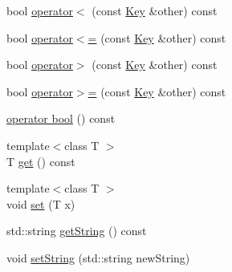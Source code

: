 \begin{DoxyCompactItemize}
bool \hyperlink{classkdb_1_1Key_aace409efd393ae21f08d333f45da2769}{operator$<$} (const \hyperlink{classkdb_1_1Key}{Key} \&other) const 
\begin{DoxyCompactList}\small\item\em \end{DoxyCompactList}\item 
bool \hyperlink{classkdb_1_1Key_a3b466f59870b989aa9ec41558bba4d19}{operator$<$=} (const \hyperlink{classkdb_1_1Key}{Key} \&other) const 
\begin{DoxyCompactList}\small\item\em \end{DoxyCompactList}\item 
bool \hyperlink{classkdb_1_1Key_a1bd2b165eeade6a71401b9b122864bad}{operator$>$} (const \hyperlink{classkdb_1_1Key}{Key} \&other) const 
\begin{DoxyCompactList}\small\item\em \end{DoxyCompactList}\item 
bool \hyperlink{classkdb_1_1Key_aa1258657e3dbddf4aed3716dd63d2a3c}{operator$>$=} (const \hyperlink{classkdb_1_1Key}{Key} \&other) const 
\begin{DoxyCompactList}\small\item\em \end{DoxyCompactList}\item 
\hyperlink{classkdb_1_1Key_ac203d41896988df49dd149c2a6ad91d8}{operator bool} () const 
\item 
{\footnotesize template$<$class T $>$ }\\T \hyperlink{classkdb_1_1Key_ae8f4cf386b825c8efc29ce0db977f0d2}{get} () const 
\begin{DoxyCompactList}\small\item\em \end{DoxyCompactList}\item 
{\footnotesize template$<$class T $>$ }\\void \hyperlink{classkdb_1_1Key_a615124f0a2b291e03975b49c233654d7}{set} (T x)
\begin{DoxyCompactList}\small\item\em \end{DoxyCompactList}\item 
std\-::string \hyperlink{classkdb_1_1Key_afbad98e920ffb6d65d5d690be73ae6d9}{get\-String} () const 
\item 
void \hyperlink{classkdb_1_1Key_ab97ef37aa235f0ae04dc6e6c21109d1a}{set\-String} (std\-::string new\-String)

\end{DoxyCompactItemize}
